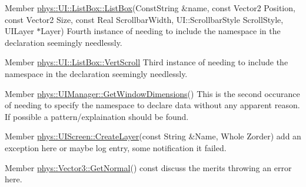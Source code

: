 \label{dd/da0/todo__todo000025}
\hypertarget{dd/da0/todo__todo000025}{}
 
\begin{DoxyDescription}
\item[Member \hyperlink{classphys_1_1UI_1_1ListBox_a0bf957f875c9a7c5361c26b5001ce821}{phys::UI::ListBox::ListBox}(ConstString \&name, const Vector2 Position, const Vector2 Size, const Real ScrollbarWidth, UI::ScrollbarStyle ScrollStyle, UILayer $\ast$Layer) ]Fourth instance of needing to include the namespace in the declaration seemingly needlessly. 
\end{DoxyDescription}

\label{dd/da0/todo__todo000026}
\hypertarget{dd/da0/todo__todo000026}{}
 
\begin{DoxyDescription}
\item[Member \hyperlink{classphys_1_1UI_1_1ListBox_ab2b012b345ff4bb1a5b228fef88d895c}{phys::UI::ListBox::VertScroll} ]Third instance of needing to include the namespace in the declaration seemingly needlessly. 
\end{DoxyDescription}

\label{dd/da0/todo__todo000027}
\hypertarget{dd/da0/todo__todo000027}{}
 
\begin{DoxyDescription}
\item[Member \hyperlink{classphys_1_1UIManager_ae56846a64d8ce312aa36a749d15619df}{phys::UIManager::GetWindowDimensions}() ]This is the second occurance of needing to specify the namespace to declare data without any apparent reason. If possible a pattern/explaination should be found. 
\end{DoxyDescription}

\label{dd/da0/todo__todo000028}
\hypertarget{dd/da0/todo__todo000028}{}
 
\begin{DoxyDescription}
\item[Member \hyperlink{classphys_1_1UIScreen_a14c3256bda81d40553ff065993fcbe77}{phys::UIScreen::CreateLayer}(const String \&Name, Whole Zorder) ]add an exception here or maybe log entry, some notification it failed. 
\end{DoxyDescription}

\label{dd/da0/todo__todo000030}
\hypertarget{dd/da0/todo__todo000030}{}
 
\begin{DoxyDescription}
\item[Member \hyperlink{classphys_1_1Vector3_a81e11f45378758391c97ec55b519951c}{phys::Vector3::GetNormal}() const  ]discuss the merits throwing an error here. 
\end{DoxyDescription}

